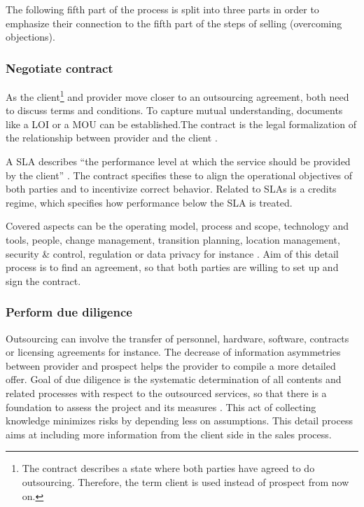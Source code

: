 	The following fifth part of the process is split into three parts in order to emphasize their connection to the fifth part of the steps of selling (overcoming objections). 
	
		
	\subsubsection{Negotiate contract}
	
	As the client\footnote{The contract describes a state where both parties have agreed to do outsourcing. Therefore, the term client is used instead of prospect from now on.} and provider move closer to an outsourcing agreement, both need to discuss terms and conditions. To capture mutual understanding, documents like a \acrfull{LOI} or a \acrfull{MOU} can be established.The contract is the legal formalization of the relationship between provider and the client \citep{Franceschini_2003}. 
	
	A \acrfull{SLA} describes \enquote{the performance level at which the service should be provided by the client} \citep[]{deloittehandbook}. The contract specifies these to align the operational objectives of both parties and to incentivize correct behavior. Related to \acrshort{SLA}s is a credits regime, which specifies how performance below the \acrshort{SLA} is treated. 
	
	Covered aspects can be the operating model, process and scope, technology and tools, people, change management, transition planning, location management, security \& control, regulation or data privacy for instance \citep{deloittehandbook}. Aim of this detail process is to find an agreement, so that both parties are willing to set up and sign the contract.
	
	
	\subsubsection{Perform due diligence}
	
	Outsourcing can involve the transfer of personnel, hardware, software, contracts or licensing agreements for instance. The decrease of information asymmetries between provider and prospect helps the provider to compile a more detailed offer. Goal of due diligence is the systematic determination of all contents and related processes with respect to the outsourced services, so that there is a foundation to assess the project and its measures \citep[]{bitkom2008}. This act of collecting knowledge minimizes risks by depending less on assumptions. This detail process aims at including more information from the client side in the sales process. 

